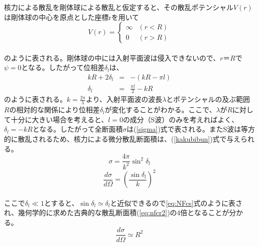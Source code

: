 \documentclass[a4paper,11pt,dvipdfmx]{jsarticle}
\begin{document}
\noindent
核力による散乱を剛体球による散乱と仮定すると、その散乱ポテンシャル$V(r)$は剛体球の中心を原点とした座標rを用いて\\
\begin{equation}
    V(r) = \begin{cases}
    \infty & (r < R)\\
    0 & (r > R)
    \end{cases}
\end{equation}\\
のように表される。剛体球の中には入射平面波は侵入できないので、$r＝R$で$\psi=0$となる。したがって位相差$\delta_l$は、
\begin{eqnarray}
    kR + 2\delta_l &=& -( kR - \pi l)\\
   \delta_l &=& \frac{\pi l}{2} - kR 
\end{eqnarray}
のように表される。$k=\frac{2\pi}{\lambda}$より、入射平面波の波長$\lambda$とポテンシャルの及ぶ範囲$R$の相対的な関係により位相差$\delta_l$が変化することがわかる。ここで、$\lambda$が$R$に対して十分に大きい場合を考えると、$l=0$の成分（S波）のみを考えればよく、$\delta_l=-kR$となる。したがって全断面積$\sigma$は(\ref{sigma})式で表される。またS波は等方的に散乱されるため、核力による微分散乱断面積は、(\ref{kakubibun})式で与えられる。\\
\begin{equation}
    \sigma = \frac{4\pi}{k^2}\sin^2 {\delta_l}
    \label{sigma}
\end{equation}
\begin{equation}
   \frac{d\sigma}{d\Omega} = \left(\frac{\sin \delta_l}{k}\right)^2
   \label{kakubibun}
\end{equation}\\
ここで$\delta_l \ll 1$とすると、$\sin \delta_l \simeq \delta_l$と近似できるので\eqref{eq:NFcs}式のように表され、幾何学的に求めた古典的な散乱断面積(\ref{eq:nfcr2})の4倍となることが分かる。\\
\begin{equation}
    \frac{d\sigma}{d\Omega} \simeq R^2
    \label{eq:NFcs}
\end{equation}
\end{document}
